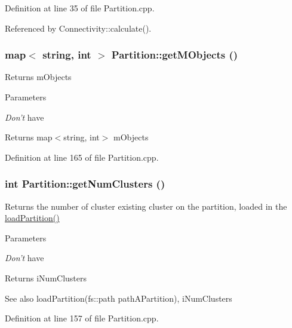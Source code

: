 Definition at line 35 of file Partition.cpp.

Referenced by Connectivity::calculate().\hypertarget{classPartition_a4b2602b02fe2577c33b9f344a242cd32}{
\subsubsection[{getMObjects}]{\setlength{\rightskip}{0pt plus 5cm}map$<$ string, int $>$ Partition::getMObjects ()}}
\label{classPartition_a4b2602b02fe2577c33b9f344a242cd32}
Returns mObjects 
\begin{DoxyParams}{Parameters}
\item[{\em Don't}]have \end{DoxyParams}
\begin{DoxyReturn}{Returns}
map$<$string, int$>$ mObjects 
\end{DoxyReturn}


Definition at line 165 of file Partition.cpp.\hypertarget{classPartition_ae78d06ba7708ffc35f93dfe166315c74}{
\subsubsection[{getNumClusters}]{\setlength{\rightskip}{0pt plus 5cm}int Partition::getNumClusters ()}}
\label{classPartition_ae78d06ba7708ffc35f93dfe166315c74}
Returns the number of cluster existing cluster on the partition, loaded in the \hyperlink{classPartition_a025f8c250b2e7bb9d74ff18e6839105a}{loadPartition()} 
\begin{DoxyParams}{Parameters}
\item[{\em Don't}]have \end{DoxyParams}
\begin{DoxyReturn}{Returns}
iNumClusters 
\end{DoxyReturn}
\begin{DoxySeeAlso}{See also}
loadPartition(fs::path pathAPartition), iNumClusters 
\end{DoxySeeAlso}


Definition at line 157 of file Partition.cpp.

